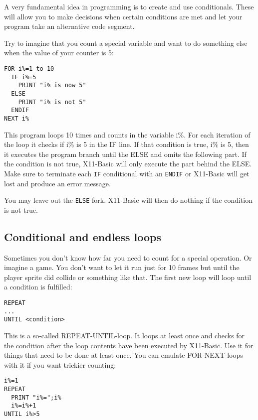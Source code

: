 A very fundamental idea in programming is to create and use conditionals. These
will allow you to make decisions when certain conditions are met and let your
program take an alternative code segment.

Try to imagine that you count a special variable and want to do something else
when the value of your counter is 5:
\begin{mdframed}[hidealllines=true,backgroundcolor=blue!20]
\begin{verbatim}
FOR i%=1 to 10
  IF i%=5
    PRINT "i% is now 5"
  ELSE
    PRINT "i% is not 5"
  ENDIF
NEXT i%
\end{verbatim}
\end{mdframed}

This program loops 10 times and counts in the variable i\%.
For each iteration of the loop it checks if i\% is 5 in the IF line. If that
condition is true, i\% is 5, then it executes the program branch until the ELSE
and omits the following part. If the condition is not true, X11-Basic will only
execute the part behind the ELSE. Make sure to terminate each \verb|IF| conditional
with an \verb|ENDIF| or X11-Basic will get lost and produce an error message. 

You may leave out the \verb|ELSE| fork. X11-Basic will then do nothing if the 
condition is not true.

\subsection{Conditional and endless loops}


Sometimes you don't know how far you need to count for a special operation. Or
imagine a game. You don't want to let it run just for 10 frames but until the
player sprite did collide or something like that. The first new loop will loop
until a condition is fulfilled:

\begin{verbatim}
REPEAT
...
UNTIL <condition>
\end{verbatim}

This is a so-called REPEAT-UNTIL-loop. It loops at least once and checks for
the condition after the loop contents have been executed by X11-Basic. Use it
for things that need to be done at least once. You can emulate FOR-NEXT-loops
with it if you want trickier counting:
\begin{mdframed}[hidealllines=true,backgroundcolor=blue!20]
\begin{verbatim}
i%=1
REPEAT
  PRINT "i%=";i%
  i%=i%+1
UNTIL i%>5
\end{verbatim}
\end{mdframed}

